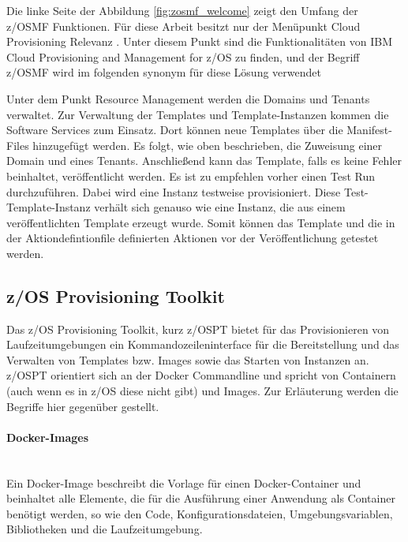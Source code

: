 Die linke Seite der Abbildung \ref{fig:zosmf_welcome} zeigt den Umfang der z/OSMF  Funktionen.
Für diese Arbeit besitzt nur der Menüpunkt \glqq Cloud Provisioning\grqq{} Relevanz .
Unter diesem Punkt sind die Funktionalitäten von \glqq IBM Cloud Provisioning and Management for z/OS\grqq{} zu finden, und der Begriff  \glqq z/OSMF\grqq{} wird im folgenden synonym für diese Lösung verwendet
\cite{Rotthove.2018}

Unter dem Punkt \glqq Resource Management\grqq{} werden die \glqq Domains\grqq{} und \glqq Tenants\grqq{} verwaltet.
Zur Verwaltung der Templates und Template-Instanzen kommen die \glqq Software Services\grqq{} zum Einsatz.
Dort können neue Templates über die Manifest-Files hinzugefügt werden.
Es folgt, wie oben beschrieben, die Zuweisung einer \glqq Domain\grqq{} und eines \glqq Tenants\grqq{}.
Anschließend kann das Template, falls es keine Fehler beinhaltet, veröffentlicht werden.
Es ist zu empfehlen vorher einen \glqq Test Run\grqq{} durchzuführen.
Dabei wird eine Instanz testweise provisioniert.
Diese Test-Template-Instanz verhält sich genauso wie eine Instanz, die aus einem veröffentlichten Template erzeugt wurde. 
Somit können das Template und die in der Aktiondefintionfile definierten Aktionen vor der Veröffentlichung getestet werden.
\cite{Rotthove.2018}


\subsection{z/OS Provisioning Toolkit}\label{sssec:zospt}
Das z/OS Provisioning Toolkit, kurz z/OSPT bietet für das Provisionieren von Laufzeitumgebungen ein Kommandozeileninterface für die Bereitstellung und das Verwalten von Templates bzw. \glqq Images\grqq{} sowie das Starten von Instanzen an. 
z/OSPT orientiert sich an der Docker Commandline und spricht von Containern (auch wenn es in z/OS diese nicht gibt) und Images.
Zur Erläuterung werden die Begriffe hier  gegenüber gestellt.

\paragraph{\glqq Docker-Images\grqq}~\\
Ein Docker-Image beschreibt die Vorlage für einen Docker-Container und beinhaltet alle Elemente, die für die Ausführung einer Anwendung als Container benötigt werden, so wie den Code, Konfigurationsdateien, Umgebungsvariablen, Bibliotheken und die Laufzeitumgebung.

